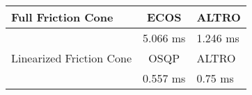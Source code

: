 \begin{tabular}{lcl}
\toprule 
Full Friction Cone & ECOS & ALTRO \\
\midrule 
 & 5.066 ms & 1.246 ms \\
\toprule 
Linearized Friction Cone & OSQP & ALTRO \\
\midrule 
 & 0.557 ms & 0.75 ms \\
\bottomrule 
\end{tabular}

